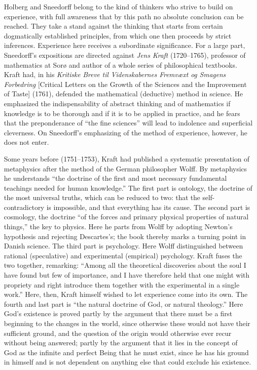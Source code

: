 \documentclass[12pt,a4paper]{book}
\newcommand{\opage}[1]{\marginnote{\footnotesize\textit{[#1]}}}
\begin{document}
Holberg and Sneedorff belong to the kind of thinkers who strive to build on
experience, with full awareness that by this path no absolute conclusion can be
reached. They take a stand against the thinking that starts from certain
dogmatically established principles, from which one then proceeds by strict
inferences. Experience here receives a subordinate significance. For a large
part, Sneedorff's expositions are directed against \emph{Jens Kraft} (1720--1765),
professor of mathematics at Sorø and author of a whole series of philosophical
textbooks. Kraft had, in his \emph{Kritiske Breve til Videnskabernes Fremvæxt og
Smagens Forbedring} [Critical Letters on the Growth of the Sciences and the
Improvement of Taste] (1761), defended the mathematical (deductive) method in
science. He emphasized the indispensability of abstract thinking and of
mathematics if knowledge is to be thorough and if it is to be applied in
practice, and he fears that the preponderance of ``the fine sciences'' will lead
to indolence and superficial cleverness. On Sneedorff's emphasizing of the method
of experience, however, he does not enter.

Some years before (1751--1753), Kraft had published a systematic presentation of
metaphysics after the method of the German philosopher Wolff. By metaphysics he
understands ``the doctrine of the first and most necessary fundamental teachings
needed for human knowledge.'' The first part is ontology, the doctrine of the
most universal truths, which can be reduced to two: that the self-contradictory
is impossible, and \opage{20}that everything has its cause. The second part is cosmology,
the doctrine ``of the forces and primary physical properties of natural things,''
the key to physics. Here he parts from Wolff by adopting Newton's hypothesis and
rejecting Descartes's; the book thereby marks a turning point in Danish science.
The third part is psychology. Here Wolff distinguished between rational
(speculative) and experimental (empirical) psychology. Kraft fuses the two
together, remarking: ``Among all the theoretical discoveries about the soul I
have found but few of importance, and I have therefore held that one might with
propriety and right introduce them together with the experimental in a single
work.'' Here, then, Kraft himself wished to let experience come into its own. The
fourth and last part is ``the natural doctrine of God, or natural theology.''
Here God's existence is proved partly by the argument that there must be a first
beginning to the changes in the world, since otherwise these would not have their
sufficient ground, and the question of the origin would otherwise ever recur
without being answered; partly by the argument that it lies in the concept of God
as the infinite and perfect Being that he must exist, since he has his ground in
himself and is not dependent on anything else that could exclude his existence.
\end{document}

